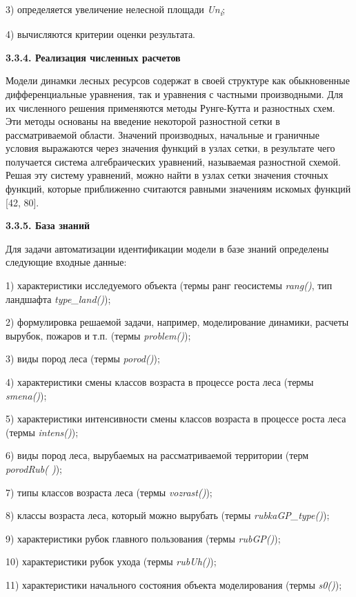 \documentclass{article}
\begin{document}
3) определяется увеличение нелесной площади 
\textit{Un}\textsubscript{\textit{i}};

4) вычисляются критерии оценки результата.\label{HToc199746731}

\textbf{3.3.4. Реализация численных расчетов}

Модели динамки лесных ресурсов содержат в своей 
структуре как обыкновенные дифференциальные 
уравнения, так и уравнения с частными производными. 
Для их численного решения применяются методы 
Рунге-Кутта и разностных схем. Эти методы основаны 
на введение некоторой разностной сетки в рассматриваемой 
области. Значений производных, начальные и 
граничные условия выражаются через значения 
функций в узлах сетки, в результате чего получается 
система алгебраических уравнений, называемая 
разностной схемой. Решая эту систему уравнений, 
можно найти в узлах сетки значения сточных 
функций, которые приближенно считаются равными 
значениям искомых функций [42, 80].\label{HToc199746732}

\textbf{3.3.5. База знаний}

Для задачи автоматизации идентификации модели 
в базе знаний определены следующие входные 
данные:

1) характеристики исследуемого объекта (термы\textit{ 
}ранг геосистемы \textit{rang()}, тип ландшафта \textit{type\_land()});

2) формулировка решаемой задачи, например, моделирование 
динамики, расчеты вырубок, пожаров и т.п.  (термы 
\textit{problem()});

3) виды пород леса (термы \textit{porod()});

4) характеристики смены классов возраста в процессе 
роста леса (термы \textit{smena()});

5) характеристики интенсивности смены классов 
возраста в процессе роста леса (термы \textit{intens()});

6) виды пород леса, вырубаемых на рассматриваемой 
территории (терм \textit{porodRub( )});

7) типы классов возраста леса (термы \textit{vozrast()});

8) классы возраста леса, который можно вырубать 
(термы \textit{rubkaGP\_type()});

9) характеристики рубок главного пользования 
(термы \textit{rubGP()});

10) характеристики рубок ухода (термы \textit{rubUh()});

11) характеристики начального состояния объекта 
моделирования (термы \textit{s0()});
\end{document}
